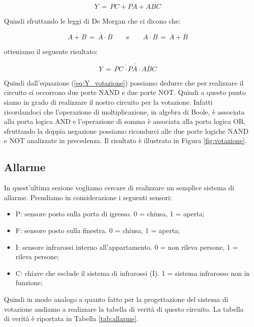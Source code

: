 \begin{equation*}
	Y\,=\,PC+PA+ABC 
\end{equation*}

Quindi sfruttando le leggi di De Morgan che ci dicono che:

\begin{equation*}
	\overline{A+B}\,=\,\overline{A} \cdot \overline{B} \qquad \text{e} \qquad \overline{A \cdot B}\,=\,\overline{A}+\overline{B}
\end{equation*}

otteniamo il seguente risultato:

\begin{equation}
	Y\,=\, \overline{ \overline{PC \cdot PA} \cdot \overline{ABC} }
\label{eq:Y_votazione}
\end{equation}

Quindi dall'equazione (\ref{eq:Y_votazione}) possiamo dedurre che per realizzare il circuito ci occorrono due porte NAND e due porte NOT.
Quindi a questo punto siamo in grado di realizzare il nostro circuito per la votazione. Infatti ricordandoci che l'operazione di moltiplicazione, in algebra di Boole, è associata alla porta logica AND e l'operazione di somma è associata alla porta logica OR, sfruttando la doppia negazione possiamo ricondurci alle due porte logiche NAND e NOT analizzate in precedenza. Il risultato è illustrato in Figura \ref{fig:votazione}.

\subsection*{Allarme}

In quest'ultima sezione vogliamo cercare di realizzare un semplice sistema di allarme. Prendiamo in considerazione i seguenti sensori:
\begin{itemize}\itemsep2pt \parskip0pt 
	\item{P: sensore posto sulla porta di igresso. 0 = chiusa, 1 = aperta;}
	\item{F: sensore posto sulla finestra. 0 = chiusa, 1 = aperta;}
	\item{I: sensore infrarossi interno all'appartamento. 0 = non rileva persone, 1 = rileva persone;}
	\item{C: chiave che esclude il sistema di infrarossi (I). 1 = sistema infrarosso non in funzione;}
\end{itemize}
Quindi in modo analogo a quanto fatto per la progettazione del sistema di votazione andiamo a realizzare la tabella di verità di questo circuito. La tabella di verità è riportata in Tabella \ref{tab:allarme}.

